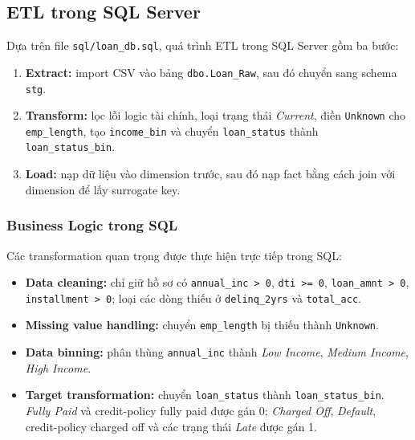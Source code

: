 \subsection{ETL trong SQL Server}
Dựa trên file \texttt{sql/loan\_db.sql}, quá trình ETL trong SQL Server gồm ba bước:
\begin{enumerate}
    \item \textbf{Extract:} import CSV vào bảng \texttt{dbo.Loan\_Raw}, sau đó chuyển sang schema \texttt{stg}.
    \item \textbf{Transform:} lọc lỗi logic tài chính, loại trạng thái \textit{Current}, điền \texttt{Unknown} cho \texttt{emp\_length}, tạo \texttt{income\_bin} và chuyển \texttt{loan\_status} thành \texttt{loan\_status\_bin}.
    \item \textbf{Load:} nạp dữ liệu vào dimension trước, sau đó nạp fact bằng cách join với dimension để lấy surrogate key.
\end{enumerate}

\subsubsection{Business Logic trong SQL}
Các transformation quan trọng được thực hiện trực tiếp trong SQL:
\begin{itemize}
    \item \textbf{Data cleaning:} chỉ giữ hồ sơ có \texttt{annual\_inc > 0}, \texttt{dti >= 0}, \texttt{loan\_amnt > 0}, \texttt{installment > 0}; loại các dòng thiếu ở \texttt{delinq\_2yrs} và \texttt{total\_acc}.
    \item \textbf{Missing value handling:} chuyển \texttt{emp\_length} bị thiếu thành \texttt{Unknown}.
    \item \textbf{Data binning:} phân thùng \texttt{annual\_inc} thành \textit{Low Income}, \textit{Medium Income}, \textit{High Income}.
    \item \textbf{Target transformation:} chuyển \texttt{loan\_status} thành \texttt{loan\_status\_bin}. \textit{Fully Paid} và credit-policy fully paid được gán 0; \textit{Charged Off}, \textit{Default}, credit-policy charged off và các trạng thái \textit{Late} được gán 1.
\end{itemize}

